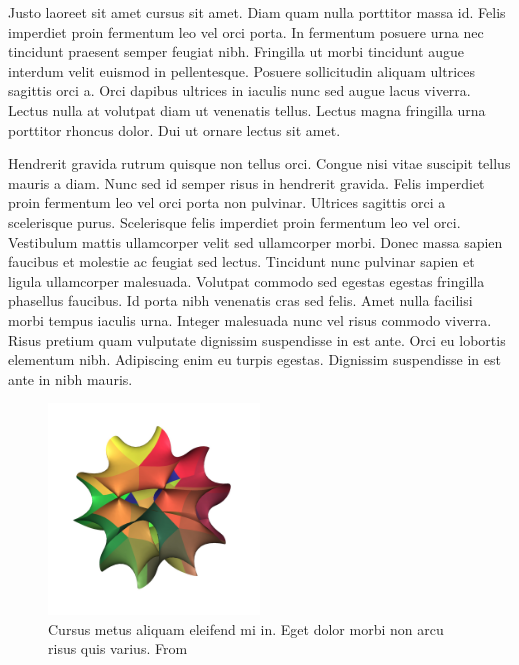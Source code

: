 \documentclass[10pt, a4paper]{article}
\numberwithin{equation}{section}
\begin{document}
Justo laoreet sit amet cursus sit amet. Diam quam nulla porttitor massa id. Felis imperdiet proin fermentum leo vel orci porta. In fermentum posuere urna nec tincidunt praesent semper feugiat nibh. Fringilla ut morbi tincidunt augue interdum velit euismod in pellentesque. Posuere sollicitudin aliquam ultrices sagittis orci a. Orci dapibus ultrices in iaculis nunc sed augue lacus viverra. Lectus nulla at volutpat diam ut venenatis tellus. Lectus magna fringilla urna porttitor rhoncus dolor. Dui ut ornare lectus sit amet.

Hendrerit gravida rutrum quisque non tellus orci. Congue nisi vitae suscipit tellus mauris a diam. Nunc sed id semper risus in hendrerit gravida. Felis imperdiet proin fermentum leo vel orci porta non pulvinar. Ultrices sagittis orci a scelerisque purus. Scelerisque felis imperdiet proin fermentum leo vel orci. Vestibulum mattis ullamcorper velit sed ullamcorper morbi. Donec massa sapien faucibus et molestie ac feugiat sed lectus. Tincidunt nunc pulvinar sapien et ligula ullamcorper malesuada. Volutpat commodo sed egestas egestas fringilla phasellus faucibus. Id porta nibh venenatis cras sed felis. Amet nulla facilisi morbi tempus iaculis urna. Integer malesuada nunc vel risus commodo viverra. Risus pretium quam vulputate dignissim suspendisse in est ante. Orci eu lobortis elementum nibh. Adipiscing enim eu turpis egestas. Dignissim suspendisse in est ante in nibh mauris.

\begin{figure}[ht]
  \centering
  \includegraphics[width=0.5\textwidth]{CalabiYau5.jpg}
  \caption{Cursus metus aliquam eleifend mi in. Eget dolor morbi non arcu risus quis varius. From \cite{wiki:xxx}}
  \label{fig:calabi-yau}
\end{figure}
\end{document}
